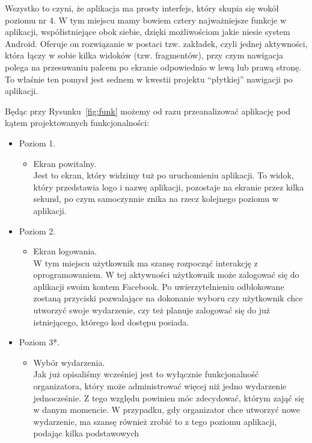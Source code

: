 \documentclass[10pt,titlepage]{article}
\begin{document}
Wszystko to czyni, że aplikacja ma prosty interfejs, który skupia się wokół poziomu nr 4. 
W tym miejscu mamy bowiem cztery najważniejsze funkcje w aplikacji, współistniejące obok siebie, dzięki możliwościom jakie niesie system Android. Oferuje on rozwiązanie w postaci
tzw. zakładek, czyli jednej aktywności, która łączy w sobie kilka widoków (tzw. fragmentów), przy czym nawigacja polega na przesuwaniu palcem po ekranie odpowiednio w lewą lub prawą stronę. 
To właśnie ten pomysł jest sednem w kwestii projektu ``płytkiej'' nawigacji po aplikacji.

Będąc przy Rysunku~\ref{fig:funk} możemy od razu przeanalizować aplikację pod kątem projektowanych funkcjonalności:

\begin{itemize}
 \item Poziom 1.
      \begin{itemize}
        \item Ekran powitalny.
        \\Jest to ekran, który widzimy tuż po uruchomieniu aplikacji. To widok, który przedstawia logo i nazwę aplikacji, pozostaje na ekranie przez kilka sekund, po czym samoczynnie
        znika na rzecz kolejnego poziomu w aplikacji.
       \end{itemize}
 \item Poziom 2.
       \begin{itemize}
        \item Ekran logowania.
        \\ W tym miejscu użytkownik ma szansę rozpocząć interakcję z oprogramowaniem. W tej aktywności użytkownik może zalogować się do aplikacji swoim kontem Facebook.
        Po uwierzytelnieniu odblokowane zostaną przyciski pozwalające na dokonanie wyboru czy użytkownik chce utworzyć swoje wydarzenie, czy też planuje zalogować się
        do już istniejącego, którego kod dostępu posiada.
       \end{itemize}
 \item Poziom 3*.
      \begin{itemize}
       \item Wybór wydarzenia.
       \\ Jak już opisaliśmy wcześniej jest to wyłącznie funkcjonalność organizatora, który może administrować więcej niż jedno wydarzenie jednocześnie. Z tego względu powinien móc
       zdecydować, którym zająć się w danym momencie. W przypadku, gdy organizator chce utworzyć nowe wydarzenie, ma szansę również zrobić to z tego poziomu aplikacji, podając kilka podstawowych

\end{itemize}
\end{itemize}
\end{document}
